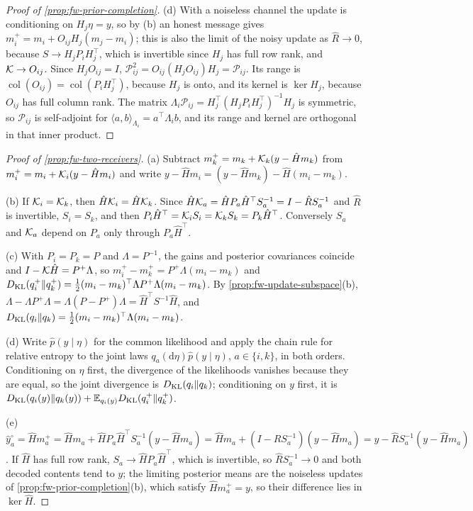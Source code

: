 \begin{proof}[Proof of \cref{prop:fw-prior-completion}]
(d) With a noiseless channel the update is conditioning on $H_j\eta=y$, so by (b) an honest message gives $m_i^+=m_i+O_{ij}H_j(m_j-m_i)$; this is also the limit of the noisy update as $\hat R\to0$, because $S\to H_jP_iH_j^\top$, which is invertible since $H_j$ has full row rank, and $\mathcal{K}\to O_{ij}$. Since $H_jO_{ij}=I$, $\mathcal P_{ij}^2=O_{ij}(H_jO_{ij})H_j=\mathcal P_{ij}$. Its range is $\operatorname{col}(O_{ij})=\operatorname{col}(P_iH_j^\top)$, because $H_j$ is onto, and its kernel is $\ker H_j$, because $O_{ij}$ has full column rank. The matrix $\Lambda_i\mathcal P_{ij}=H_j^\top(H_jP_iH_j^\top)^{-1}H_j$ is symmetric, so $\mathcal P_{ij}$ is self-adjoint for $\langle a,b\rangle_{\Lambda_i}=a^\top\Lambda_ib$, and its range and kernel are orthogonal in that inner product.
\end{proof}

\begin{proof}[Proof of \cref{prop:fw-two-receivers}]
(a) Subtract $m_k^+=m_k+\mathcal{K}_k(y-\hat Hm_k)$ from $m_i^+=m_i+\mathcal{K}_i(y-\hat Hm_i)$ and write $y-\hat Hm_i=(y-\hat Hm_k)-\hat H(m_i-m_k)$.

(b) If $\mathcal{K}_i=\mathcal{K}_k$, then $\hat H\mathcal{K}_i=\hat H\mathcal{K}_k$. Since $\hat H\mathcal{K}_a=\hat HP_a\hat H^\top S_a^{-1}=I-\hat RS_a^{-1}$ and $\hat R$ is invertible, $S_i=S_k$, and then $P_i\hat H^\top=\mathcal{K}_iS_i=\mathcal{K}_kS_k=P_k\hat H^\top$. Conversely $S_a$ and $\mathcal{K}_a$ depend on $P_a$ only through $P_a\hat H^\top$.

(c) With $P_i=P_k=P$ and $\Lambda=P^{-1}$, the gains and posterior covariances coincide and $I-\mathcal{K}\hat H=P^+\Lambda$, so $m_i^+-m_k^+=P^+\Lambda(m_i-m_k)$ and $D_{\mathrm{KL}}(q_i^+\Vert q_k^+)=\tfrac12(m_i-m_k)^\top\Lambda P^+\Lambda(m_i-m_k)$. By \cref{prop:fw-update-subspace}(b), $\Lambda-\Lambda P^+\Lambda=\Lambda(P-P^+)\Lambda=\hat H^\top S^{-1}\hat H$, and $D_{\mathrm{KL}}(q_i\Vert q_k)=\tfrac12(m_i-m_k)^\top\Lambda(m_i-m_k)$.

(d) Write $\hat p(y\mid\eta)$ for the common likelihood and apply the chain rule for relative entropy to the joint laws $q_a(\mathrm d\eta)\hat p(y\mid\eta)$, $a\in\{i,k\}$, in both orders. Conditioning on $\eta$ first, the divergence of the likelihoods vanishes because they are equal, so the joint divergence is $D_{\mathrm{KL}}(q_i\Vert q_k)$; conditioning on $y$ first, it is $D_{\mathrm{KL}}(q_i(y)\Vert q_k(y))+\mathbb{E}_{q_i(y)}D_{\mathrm{KL}}(q_i^+\Vert q_k^+)$.

(e) $\hat y^\circ_a=\hat Hm_a^+=\hat Hm_a+\hat HP_a\hat H^\top S_a^{-1}(y-\hat Hm_a)=\hat Hm_a+(I-\hat RS_a^{-1})(y-\hat Hm_a)=y-\hat RS_a^{-1}(y-\hat Hm_a)$. If $\hat H$ has full row rank, $S_a\to\hat HP_a\hat H^\top$, which is invertible, so $\hat RS_a^{-1}\to0$ and both decoded contents tend to $y$; the limiting posterior means are the noiseless updates of \cref{prop:fw-prior-completion}(b), which satisfy $\hat Hm_a^+=y$, so their difference lies in $\ker\hat H$.
\end{proof}

